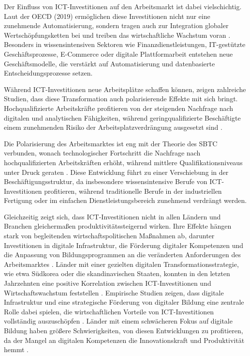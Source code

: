 Der Einfluss von \ac{ICT}-Investitionen auf den Arbeitsmarkt ist dabei vielschichtig. Laut 
der \ac{OECD} (2019) ermöglichen diese Investitionen nicht nur eine zunehmende 
Automatisierung, sondern tragen auch zur Integration globaler Wertschöpfungsketten bei 
und treiben das wirtschaftliche Wachstum voran 
\parencite[vgl.][S. 144]{oecd2019measuring}. Besonders in wissensintensiven Sektoren wie 
Finanzdienstleistungen, \ac{IT}-gestützte Geschäftsprozesse, E-Commerce oder digitale 
Plattformarbeit entstehen neue Geschäftsmodelle, die verstärkt auf Automatisierung und 
datenbasierte Entscheidungsprozesse setzen.

Während \ac{ICT}-Investitionen neue Arbeitsplätze schaffen können, zeigen zahlreiche 
Studien, dass diese Transformation auch polarisierende Effekte mit sich bringt. 
Hochqualifizierte Arbeitskräfte profitieren von der steigenden Nachfrage nach digitalen 
und analytischen Fähigkeiten, während geringqualifizierte Beschäftigte einem zunehmenden 
Risiko der Arbeitsplatzverdrängung ausgesetzt sind 
\parencite[vgl.][Kap. 2]{brynjolfsson2014thesecond}.


Die Polarisierung des Arbeitsmarktes ist eng mit der Theorie des \ac{SBTC} verbunden, 
wonach technologischer Fortschritt die Nachfrage nach hochqualifizierten Arbeitskräften 
erhöht, während mittlere Qualifikationsniveaus unter Druck geraten 
\parencite[vgl.][S. 22]{acemoglu2002technical}. Diese Entwicklung führt zu einer 
Verschiebung in der Beschäftigungsstruktur, da insbesondere wissensintensive Berufe von 
\ac{ICT}-Investitionen profitieren, während traditionelle Berufe in der industriellen 
Fertigung oder im einfachen Dienstleistungsbereich zunehmend verdrängt werden.

Gleichzeitig zeigt sich, dass \ac{ICT}-Investitionen nicht in allen Ländern und Branchen 
gleichermaßen produktivitätssteigernd wirken. Ihre Effekte hängen stark von begleitenden 
wirtschaftspolitischen Maßnahmen ab, darunter Investitionen in digitale Infrastruktur, 
die Förderung digitaler Kompetenzen und die Anpassung von Bildungsprogrammen an die 
veränderten Anforderungen des Arbeitsmarktes 
\parencite[vgl.][S. 77]{brynjolfsson2014thesecond}. Länder mit einer gezielten digitalen 
Transformationsstrategie, wie etwa Südkorea oder die skandinavischen Staaten, konnten in 
den letzten Jahrzehnten eine positive Korrelation zwischen \ac{ICT}-Investitionen und 
Wirtschaftswachstum feststellen \parencite[vgl.][S. 34]{oecd2020digital}. Empirische 
Studien zeigen, dass digitale Infrastruktur und eine strategische Förderung von digitaler 
Bildung eine zentrale Rolle dabei spielen, die wirtschaftlichen Vorteile von 
\ac{ICT}-Investitionen vollständig auszuschöpfen \parencite[vgl.][S. 360]{vu2011ict}. 
Länder mit einem schwächeren Fokus auf digitale Bildung haben größere Schwierigkeiten, 
von diesen Entwicklungen zu profitieren, da der Mangel an digitalen Kompetenzen die 
Innovationskraft und Produktivität hemmt \parencite[vgl.][S. 34]{oecd2020digital}.

